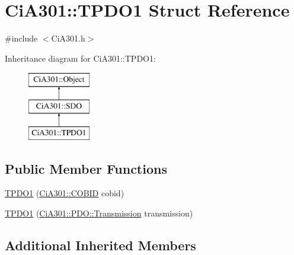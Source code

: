 \hypertarget{struct_ci_a301_1_1_t_p_d_o1}{\section{Ci\-A301\-:\-:T\-P\-D\-O1 Struct Reference}
\label{struct_ci_a301_1_1_t_p_d_o1}
}


{\ttfamily \#include $<$Ci\-A301.\-h$>$}

Inheritance diagram for Ci\-A301\-:\-:T\-P\-D\-O1\-:\begin{figure}[H]
\begin{center}
\leavevmode
\includegraphics[height=3.000000cm]{d5/de4/struct_ci_a301_1_1_t_p_d_o1}
\end{center}
\end{figure}
\subsection*{Public Member Functions}
\begin{DoxyCompactItemize}
\item 
\hyperlink{struct_ci_a301_1_1_t_p_d_o1_a3b250efdbf6970477e4d8376a7b24bbc}{T\-P\-D\-O1} (\hyperlink{namespace_ci_a301_aec5b5dbb2b60d2837c60499f6f297aa7}{Ci\-A301\-::\-C\-O\-B\-I\-D} cobid)
\item 
\hyperlink{struct_ci_a301_1_1_t_p_d_o1_a74016a4edaf61c47b34e7c9b9a21ddf8}{T\-P\-D\-O1} (\hyperlink{namespace_ci_a301_1_1_p_d_o_a6c7a5941fe4f869dd1703fb7ce7f6549}{Ci\-A301\-::\-P\-D\-O\-::\-Transmission} transmission)
\end{DoxyCompactItemize}
\subsection*{Additional Inherited Members}


